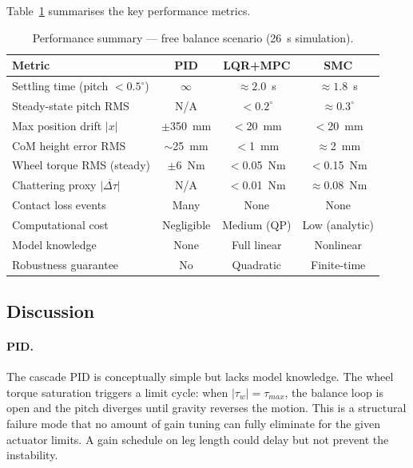 \documentclass[11pt,a4paper]{article}
\newcommand{\dgr}{^{\circ}}
\begin{document}
Table~\ref{tab:comparison} summarises the key performance metrics.

\begin{table}[H]
    \centering
    \caption{Performance summary --- free balance scenario (26~s simulation).}
    \label{tab:comparison}
    \begin{tabular}{lccc}
        \toprule
        Metric & PID & LQR+MPC & SMC \\
        \midrule
        Settling time (pitch $< 0.5\dgr$) & $\infty$ & $\approx 2.0$~s & $\approx 1.8$~s \\
        Steady-state pitch RMS & N/A & $< 0.2\dgr$ & $\approx 0.3\dgr$ \\
        Max position drift $|x|$ & $\pm$350~mm & $<$20~mm & $<$20~mm \\
        CoM height error RMS & $\sim$25~mm & $<$1~mm & $\approx$2~mm \\
        Wheel torque RMS (steady) & $\pm$6~Nm & $<$0.05~Nm & $<$0.15~Nm \\
        Chattering proxy $\overline{|\Delta\tau|}$ & N/A & $<$0.01~Nm & $\approx$0.08~Nm \\
        Contact loss events & Many & None & None \\
        Computational cost & Negligible & Medium (QP) & Low (analytic) \\
        Model knowledge & None & Full linear & Nonlinear \\
        Robustness guarantee & No & Quadratic & Finite-time \\
        \bottomrule
    \end{tabular}
\end{table}

\subsection{Discussion}

\paragraph{PID.}  The cascade PID is conceptually simple but lacks model knowledge.  The
wheel torque saturation triggers a limit cycle: when $|\tau_w| = \tau_{max}$, the balance
loop is open and the pitch diverges until gravity reverses the motion.  This is a
structural failure mode that no amount of gain tuning can fully eliminate for the given
actuator limits.  A gain schedule on leg length could delay but not prevent the instability.
\end{document}
